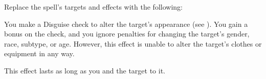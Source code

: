 


Replace the spell's targets and effects with the following:
\begin{spellcontent}

\begin{augmenttargetinginfo}



\end{augmenttargetinginfo}


\begin{augmenteffects}



\spelleffect
You make a Disguise check to alter the target's appearance (see ).
You gain a  bonus on the check, and you ignore penalties for changing the target's gender, race, subtype, or age.
However, this effect is unable to alter the target's clothes or equipment in any way.

This effect lasts as long as you and the target  to it.








\end{augmenteffects}

\end{spellcontent}








